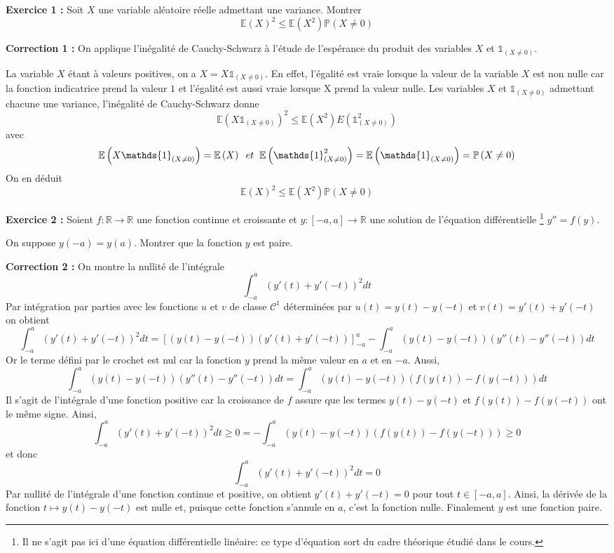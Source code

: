 \documentclass[12pt,a4paper]{article}
\newcommand{\R}{\mathbb{R}}
\begin{document}
\textbf{Exercice 1 :} Soit $X$ une variable aléatoire réelle admettant une variance.
  Montrer
  \[
  \mathbb{E}(X)^{2} \leq \mathbb{E}(X^{2})\mathbb{P}(X \neq 0)
  \]
  
\textbf{Correction 1 :} On applique l’inégalité de Cauchy-Schwarz à l’étude de l’espérance du produit des variables $X$ et $\mathds{1}_{(X \neq 0)}$.

La variable $X$ étant à valeurs positives, on a $X=X\mathds{1}_{(X \neq 0)}$. En effet, l’égalité est vraie lorsque la valeur de la variable $X$ est non nulle car la fonction indicatrice prend la valeur $1$ et l’égalité est aussi vraie lorsque X prend la valeur nulle. Les variables $X$ et $\mathds{1}_{(X \neq 0)}$ admettant chacune une variance, l’inégalité de Cauchy-Schwarz donne
	\[
\mathbb{E}\left(X\mathds{1}_{(X \neq 0)}\right)^{2} \leq \mathbb{E}\left(X^{2}\right)E\left(\mathds{1}_{(X \neq 0)}^{2}\right)
	\]
avec
	\[
\mathbb{E}\left(X \mathds{1}_{(X \neq 0)}\right) = \mathbb{E}\left(X\right) \hspace{2mm} et \hspace{2mm} \mathbb{E}\left(\mathds{1}_{(X \neq 0)}^{2}\right)= \mathbb{E}\left(\mathds{1}_{(X \neq 0)}\right)= \mathbb{P}\left(X \neq 0\right)
	\]
On en déduit
	\[
\mathbb{E}\left(X\right)^{2} \leq \mathbb{E}\left(X^{2}\right)\mathbb{P}\left(X \neq 0\right)
	\]

\textbf{Exercice 2 :} Soient $f : \R \longrightarrow \R$ une fonction continue et croissante et $y : [-a,a] \longrightarrow \R$ une solution de l'équation différentielle \footnote{Il ne s'agit pas ici d'une équation différentielle linéaire: ce type d'équation sort du cadre théorique étudié dans le cours.} $y'' = f(y)$.

  On suppose $y(-a) = y(a)$. Montrer que la fonction $y$ est paire.

\textbf{Correction 2 :} On montre la nullité de l’intégrale $$\int_{-a}^{a}(y'(t)+y'(-t))^{2}dt$$
Par intégration par parties avec les fonctions $u$ et $v$ de classe $\mathcal{C}^{1}$ déterminées 
par $u(t) = y(t)-y(-t)$ et $v(t)=y'(t)+y'(-t)$ on obtient $$\int_{-a}^{a}(y'(t)+y'(-t))^{2}dt = [(y(t)-y(-t))(y'(t)+y'(-t))]_{-a}^{a}	
- \int_{-a}^{a}(y(t)-y(-t))(y''(t)-y''(-t))dt$$	
Or le terme défini par le crochet est nul car la fonction $y$ prend la même valeur en $a$ et en $-a$. Aussi, $$\int_{-a}^{a}(y(t)-y(-t))(y''(t)-y''(-t))dt = \int_{-a}^{a}(y(t)-y(-t))(f(y(t))-f(y(-t)))dt$$
Il s’agit de l’intégrale d’une fonction positive car la croissance de $f$ assure que les termes $y(t)-y(-t)$ et $f(y(t))-f(y(-t))$ ont le même signe. Ainsi, $$\int_{-a}^{a}(y'(t)+y'(-t))^{2}dt \geq 0 = - \int_{-a}^{a}(y(t)-y(-t))(f(y(t))-f(y(-t))) \geq 0$$
et donc $$\int_{-a}^{a}(y'(t)+y'(-t))^{2}dt = 0$$
Par nullité de l’intégrale d’une fonction continue et positive, on obtient $y'(t)+y'(-t)=0$ pour tout $t \in [-a,a]$. Ainsi, la dérivée de la fonction $t \mapsto y(t)-y(-t)$ est nulle et, puisque cette fonction s’annule en $a$, c’est la fonction nulle. Finalement $y$ est une fonction paire.	
\end{document}
